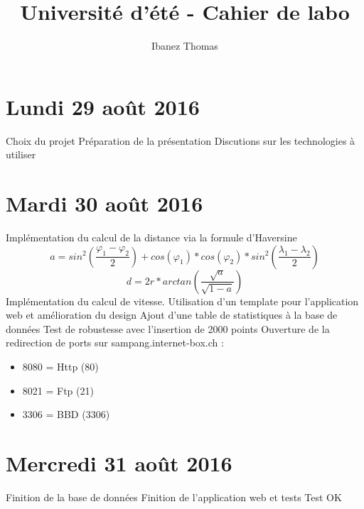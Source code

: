 \documentclass[a4paper,11pt]{article}
\title{Université d'été - Cahier de labo}
\author{Ibanez Thomas}
\begin{document}
\maketitle
\section{Lundi 29 août 2016}
Choix du projet
Préparation de la présentation
Discutions sur les technologies à utiliser

\section{Mardi 30 août 2016}
Implémentation du calcul de la distance via la formule d'Haversine
\begin{equation*}
a = sin^2(\frac{\varphi_1 - \varphi_2}{2}) + cos(\varphi_1) * cos(\varphi_2) * sin^2(\frac{\lambda_1 - \lambda_2}{2})
\end{equation*}
\begin{equation*}
d = 2r *arctan\left(\frac{\sqrt{a}}{\sqrt{1-a}}\right)
\end{equation*}
Implémentation du calcul de vitesse. \newline
Utilisation d'un template pour l'application web et amélioration du design
Ajout d'une table de statistiques à la base de données \newline
Test de robustesse avec l'insertion de 2000 points \newline
Ouverture de la redirection de ports sur sampang.internet-box.ch :
\begin{itemize}
\item 8080 = Http (80)
\item 8021 = Ftp (21)
\item 3306 = BBD (3306)
\end{itemize}
\section{Mercredi 31 août 2016}
Finition de la base de données\newline
Finition de l'application web et tests\newline
Test OK
\end{document}
